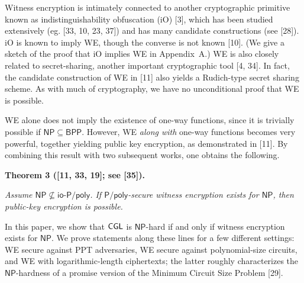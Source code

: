\documentclass[10pt,a4paper]{article}
\begin{document}
Witness encryption is intimately connected to another cryptographic primitive known as indistinguishability obfuscation (iO) [3], which has been studied extensively (eg. [33, 10, 23, 37]) and has many candidate constructions (see [28]). iO is known to imply WE, though the converse is not known [10]. (We give a sketch of the proof that iO implies WE in Appendix A.) WE is also closely related to secret-sharing, another important cryptographic tool [4, 34]. In fact, the candidate construction of WE in [11] also yields a Rudich-type secret sharing scheme. As with much of cryptography, we have no unconditional proof that WE is possible.\par




WE alone does not imply the existence of one-way functions, since it is trivially possible if ${\mathsf{NP}}\subseteq{\mathsf{BPP}}$. However, WE \emph{along with} one-way functions becomes very powerful, together yielding public key encryption, as demonstrated in [11]. By combining this result with two subsequent works, one obtains the following.\par





\par\medskip\noindent\textbf{
\textbf{Theorem 3}\textbf{ }([11, 33, 19]; see [35])\textbf{.}
}\par



\emph{Assume ${\mathsf{NP}}\nsubseteq{\mathsf{io\text{-}}}{\mathsf{P}}/{\mathsf{poly}}$. If ${\mathsf{P}}/{\mathsf{poly}}$-secure witness encryption exists for ${\mathsf{NP}}$, then public-key encryption is possible.}\par






In this paper, we show that ${\sf CGL}$ is ${\mathsf{NP}}$-hard if and only if witness encryption exists for ${\mathsf{NP}}$. We prove statements along these lines for a few different settings: WE secure against PPT adversaries, WE secure against polynomial-size circuits, and WE with logarithmic-length ciphertexts; the latter roughly characterizes the ${\mathsf{NP}}$-hardness of a promise version of the Minimum Circuit Size Problem [29].\par
\end{document}
